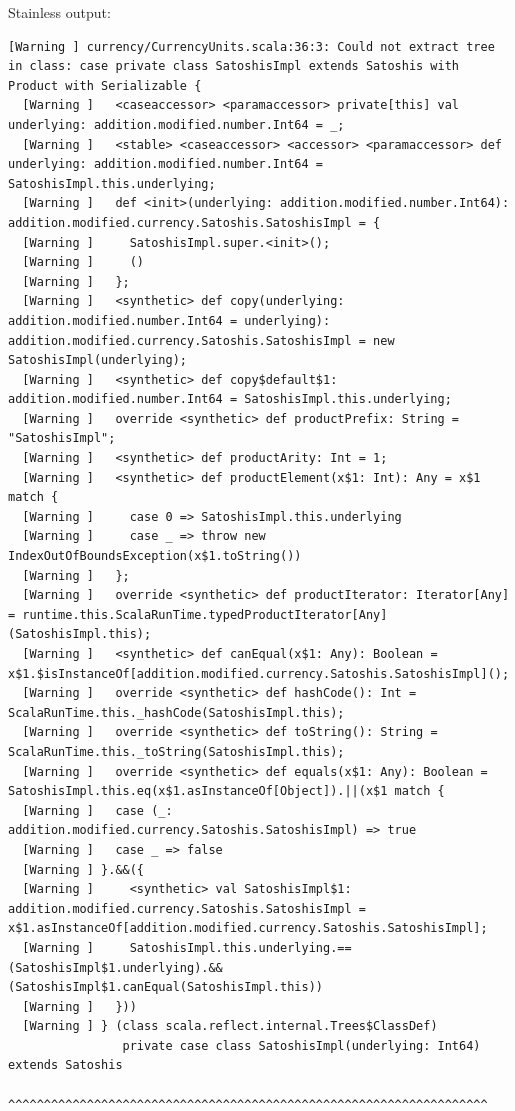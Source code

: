 \documentclass[runningheads]{llncs}
\begin{document}
Stainless output:
\begin{lstlisting}[style=stainless]
  [Warning ] currency/CurrencyUnits.scala:36:3: Could not extract tree in class: case private class SatoshisImpl extends Satoshis with Product with Serializable {
  [Warning ]   <caseaccessor> <paramaccessor> private[this] val underlying: addition.modified.number.Int64 = _;
  [Warning ]   <stable> <caseaccessor> <accessor> <paramaccessor> def underlying: addition.modified.number.Int64 = SatoshisImpl.this.underlying;
  [Warning ]   def <init>(underlying: addition.modified.number.Int64): addition.modified.currency.Satoshis.SatoshisImpl = {
  [Warning ]     SatoshisImpl.super.<init>();
  [Warning ]     ()
  [Warning ]   };
  [Warning ]   <synthetic> def copy(underlying: addition.modified.number.Int64 = underlying): addition.modified.currency.Satoshis.SatoshisImpl = new SatoshisImpl(underlying);
  [Warning ]   <synthetic> def copy$default$1: addition.modified.number.Int64 = SatoshisImpl.this.underlying;
  [Warning ]   override <synthetic> def productPrefix: String = "SatoshisImpl";
  [Warning ]   <synthetic> def productArity: Int = 1;
  [Warning ]   <synthetic> def productElement(x$1: Int): Any = x$1 match {
  [Warning ]     case 0 => SatoshisImpl.this.underlying
  [Warning ]     case _ => throw new IndexOutOfBoundsException(x$1.toString())
  [Warning ]   };
  [Warning ]   override <synthetic> def productIterator: Iterator[Any] = runtime.this.ScalaRunTime.typedProductIterator[Any](SatoshisImpl.this);
  [Warning ]   <synthetic> def canEqual(x$1: Any): Boolean = x$1.$isInstanceOf[addition.modified.currency.Satoshis.SatoshisImpl]();
  [Warning ]   override <synthetic> def hashCode(): Int = ScalaRunTime.this._hashCode(SatoshisImpl.this);
  [Warning ]   override <synthetic> def toString(): String = ScalaRunTime.this._toString(SatoshisImpl.this);
  [Warning ]   override <synthetic> def equals(x$1: Any): Boolean = SatoshisImpl.this.eq(x$1.asInstanceOf[Object]).||(x$1 match {
  [Warning ]   case (_: addition.modified.currency.Satoshis.SatoshisImpl) => true
  [Warning ]   case _ => false
  [Warning ] }.&&({
  [Warning ]     <synthetic> val SatoshisImpl$1: addition.modified.currency.Satoshis.SatoshisImpl = x$1.asInstanceOf[addition.modified.currency.Satoshis.SatoshisImpl];
  [Warning ]     SatoshisImpl.this.underlying.==(SatoshisImpl$1.underlying).&&(SatoshisImpl$1.canEqual(SatoshisImpl.this))
  [Warning ]   }))
  [Warning ] } (class scala.reflect.internal.Trees$ClassDef)
                private case class SatoshisImpl(underlying: Int64) extends Satoshis
                ^^^^^^^^^^^^^^^^^^^^^^^^^^^^^^^^^^^^^^^^^^^^^^^^^^^^^^^^^^^^^^^^^^^
\end{lstlisting}
\end{document}
